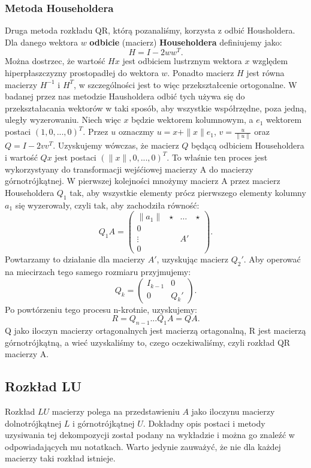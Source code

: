 \subsubsection{Metoda Householdera}
Druga metoda rozkładu QR, którą pozanaliśmy, korzysta z odbić Housholdera.
Dla danego wektora $w$ \textbf{odbicie} (macierz) \textbf{Householdera}
definiujemy jako:
$$H=I-2ww^T.$$
Można dostrzec, że wartość $Hx$ jest odbiciem lustrznym wektora $x$ względem
hiperpłaszczyzny prostopadłej do wektora $w$. Ponadto macierz $H$ jest równa
macierzy $H^{-1}$ i $H^T$, w szczególności jest to więc przekształcenie
ortogonalne. W badanej przez nas metodzie Hausholdera odbić tych używa się
do przekształacania wektorów w taki sposób, aby wszystkie współrzędne,
poza jedną, uległy wyzerowaniu. Niech więc $x$ będzie wektorem kolumnowym,
a $e_1$ wektorem postaci $(1,0,...,0)^T$. Przez $u$ oznaczmy $u=x+\|x\|e_1$,
$v=\frac{u}{\|u\|}$ oraz $Q=I-2vv^T$. Uzyskujemy wówczas, że macierz $Q$
będącą odbiciem Householdera i wartość $Qx$ jest postaci $(\|x\|,0,...,0)^T$.
To właśnie ten proces jest wykorzystyany do transformacji wejśćiowej
macierzy A do macierzy górnotrójkątnej. W pierwszej kolejności mnożymy
macierz A przez macierz Householdera $Q_1$ tak, aby wszystkie elementy
prócz pierwszego elementy kolumny $a_1$ się wyzerowały, czyli tak, aby
zachodziła równość:
$$ Q_1A = \begin{pmatrix} \|a_1\|&\star&\dots&\star\\ 0 & & & \\ \vdots & &
A' & \\ 0 & & & \end{pmatrix}.$$
Powtarzamy to działanie dla macierzy $A'$, uzyskując macierz $Q_2'$.
Aby operować na miecirzach tego samego rozmiaru przyjmujemy:
$$Q_k=\begin{pmatrix} I_{k-1} & 0 \\ 0 & Q_k' \end{pmatrix}.$$
Po powtórzeniu tego procesu n-krotnie, uzyskujemy:
$$R=Q_{n-1}...Q_1A=QA.$$
Q jako iloczyn macierzy ortagonalnych jest macierzą ortagonalną, R jest
macierzą górnotrójkątną, a wieć uzyskaliśmy to, czego oczekiwaliśmy, czyli
rozkład QR macierzy A.
\subsection{Rozkład LU}
Rozkład $LU$ macierzy polega na przedstawieniu $A$ jako iloczynu macierzy
dolnotrójkątnej $L$ i górnotrójkątnej $U$. Dokładny opis postaci i metody
uzysiwania tej dekompozycji został podany na wykładzie i można go znaleźć w
odpowiadających mu notatkach. Warto jedynie zauważyć, że nie dla każdej
macierzy taki rozkład istnieje.
